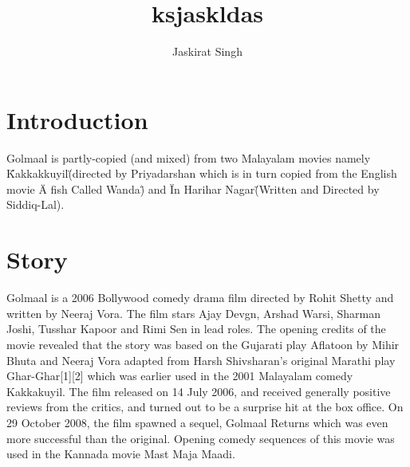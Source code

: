 \documentclass[a4paper,10pt]{article}
\title{ksjaskldas}
\author{Jaskirat Singh}
\begin{document}
\maketitle

\section{Introduction}
Golmaal is partly-copied (and mixed) from two Malayalam movies namely \"Kakkakkuyil\" (directed by Priyadarshan which is in turn copied from the English movie \"A fish Called Wanda\") and \"In Harihar Nagar\" (Written and Directed by Siddiq-Lal).
\section{Story}
Golmaal is a 2006 Bollywood comedy drama film directed by Rohit Shetty and written by Neeraj Vora.
The film stars Ajay Devgn, Arshad Warsi, Sharman Joshi, Tusshar Kapoor and Rimi Sen in lead roles. 
The opening credits of the movie revealed that the story was based on the Gujarati play Aflatoon by Mihir Bhuta and Neeraj Vora adapted from Harsh Shivsharan's original Marathi play Ghar-Ghar[1][2] which was earlier used in the 2001 Malayalam comedy Kakkakuyil. The film released on 14 July 2006, and received generally positive reviews from the critics, and turned out to be a surprise hit at the box office. On 29 October 2008, the film spawned a sequel, Golmaal Returns which was even more successful than the original. Opening comedy sequences of this movie was used in the Kannada movie Mast Maja Maadi.
\end{document}
